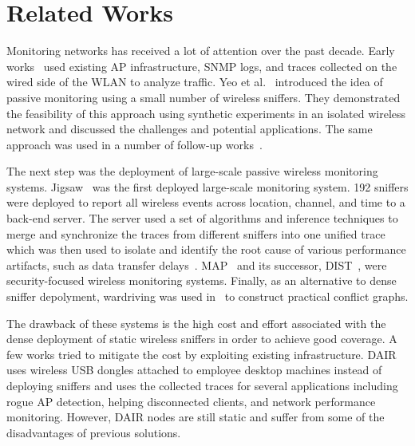 \section{Related Works}
\label{sec:related}

Monitoring \wifi{} networks has received a lot of attention over the past
decade. Early
works~\cite{balachandran:sigmetrics2002,henderson:mobicom2004,meng:mobicom2004,schwab:infocom2004,chen:mccr2010}
used existing AP infrastructure, SNMP logs, and traces collected on the wired
side of the WLAN to analyze \wifi{} traffic. Yeo et
al.~\cite{yeo:wise2004,yeo:witmemo2005} introduced the idea of passive
monitoring using a small number of wireless sniffers. They demonstrated the
feasibility of this approach using synthetic experiments in an isolated
wireless network and discussed the challenges and potential applications. The
same approach was used in a number of
follow-up works~\cite{jardosh:wind2005,jardosh:imc2005}.

The next step was the deployment of large-scale passive wireless monitoring
systems. Jigsaw~\cite{cheng:sigcomm2006} was the first deployed large-scale
monitoring system. 192 sniffers were deployed to report all wireless events
across location, channel, and time to a back-end server. The server used a set
of algorithms and inference techniques to merge and synchronize the traces from
different sniffers into one unified trace which was then used to isolate and
identify the root cause of various performance artifacts, such as data transfer
delays~\cite{cheng:sigcomm2007}.  MAP~\cite{sheng:wicom2008} and its successor,
DIST~\cite{tan:tmc2014}, were security-focused wireless monitoring systems.
Finally, as an alternative to dense sniffer depolyment, wardriving was used
in~\cite{zhou:sigmetrics2013} to construct practical conflict graphs.

The drawback of these systems is the high cost and effort associated with the
dense deployment of static wireless sniffers in order to achieve good
coverage. A few works tried to mitigate the cost by exploiting existing
infrastructure.
DAIR~\cite{bahl:mobisys2006,chan:nsdi2006} uses wireless USB dongles attached
to employee desktop machines instead of deploying
sniffers and uses the collected traces for several applications including
rogue AP detection, helping disconnected
clients, and network performance monitoring. However, DAIR nodes are still
static and suffer from some of the disadvantages of previous solutions.

